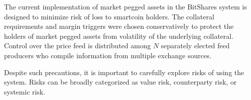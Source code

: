 The current implementation of market pegged assets in the BitShares system is
designed to minimize risk of loss to smartcoin holders. The collateral
requirements and margin triggers were chosen conservatively to protect the
holders of market pegged assets from volatility of the underlying collateral.
Control over the price feed is distributed among $N$ separately elected feed
producers who compile information from multiple exchange sources.

Despite such precautions, it is important to carefully explore risks of using
the system. Risks can be broadly categorized as value risk, counterparty risk,
or systemic risk.
